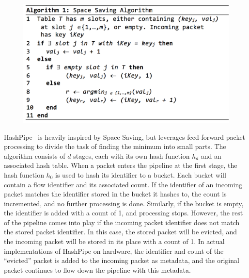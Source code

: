 \begin{figure}[t]
  \centering
    \includegraphics[scale=0.42]{alg1}
     \label{fig:bp-image}
\end{figure}
HashPipe~\cite{hashpipe} is heavily inspired by Space Saving, but leverages feed-forward packet processing to divide the task of finding the minimum into small parts. The algorithm consists of $d$ stages, each with its own hash function $h_d$ and an associated hash table. When a packet enters the pipeline at the first stage, the hash function $h_0$ is used to hash its identifier to a bucket. Each bucket will contain a flow identifier and its associated count. If the identifier of an incoming packet matches the identifier stored in the bucket it hashes to, the count is incremented, and no further processing is done. Similarly, if the bucket is empty, the identifier is added with a count of 1, and processing stops. However, the rest of the pipeline comes into play if the incoming packet identifier does not match the stored packet identifier. In this case, the stored packet will be evicted, and the incoming packet will be stored in its place with a count of 1. In actual implementations of HashPipe on hardware, the identifier and count of the ``evicted'' packet is added to the incoming packet as metadata, and the original packet continues to flow down the pipeline with this metadata.
